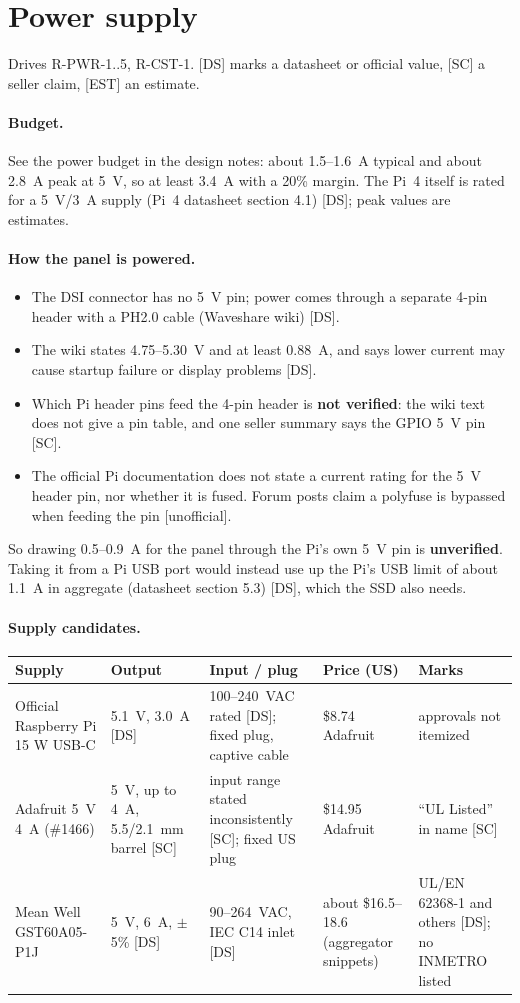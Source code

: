 \documentclass[11pt,a4paper]{article}
\begin{document}
\section{Power supply}
Drives R-PWR-1..5, R-CST-1. [DS] marks a datasheet or official value, [SC] a seller claim, [EST] an estimate.

\paragraph{Budget.} See the power budget in the design notes: about 1.5--1.6~A typical and about 2.8~A peak at 5~V, so at least 3.4~A with a 20\% margin. The Pi~4 itself is rated for a 5~V/3~A supply (Pi~4 datasheet section 4.1) [DS]; peak values are estimates.

\paragraph{How the panel is powered.}
\begin{itemize}
  \item The DSI connector has no 5~V pin; power comes through a separate 4-pin header with a PH2.0 cable (Waveshare wiki) [DS].
  \item The wiki states 4.75--5.30~V and at least 0.88~A, and says lower current may cause startup failure or display problems [DS].
  \item Which Pi header pins feed the 4-pin header is \textbf{not verified}: the wiki text does not give a pin table, and one seller summary says the GPIO 5~V pin [SC].
  \item The official Pi documentation does not state a current rating for the 5~V header pin, nor whether it is fused. Forum posts claim a polyfuse is bypassed when feeding the pin [unofficial].
\end{itemize}
So drawing 0.5--0.9~A for the panel through the Pi's own 5~V pin is \textbf{unverified}. Taking it from a Pi USB port would instead use up the Pi's USB limit of about 1.1~A in aggregate (datasheet section 5.3) [DS], which the SSD also needs.

\paragraph{Supply candidates.}
\begin{longtable}{p{3.4cm} p{3cm} p{3.3cm} p{2.4cm} p{2.4cm}}
\toprule
\textbf{Supply} & \textbf{Output} & \textbf{Input / plug} & \textbf{Price (US)} & \textbf{Marks} \\
\midrule\endhead
Official Raspberry Pi 15 W USB-C & 5.1~V, 3.0~A [DS] & 100--240~VAC rated [DS]; fixed plug, captive cable & \$8.74 Adafruit & approvals not itemized \\
Adafruit 5~V 4~A (\#1466) & 5~V, up to 4~A, 5.5/2.1~mm barrel [SC] & input range stated inconsistently [SC]; fixed US plug & \$14.95 Adafruit & ``UL Listed'' in name [SC] \\
Mean Well GST60A05-P1J & 5~V, 6~A, $\pm$5\% [DS] & 90--264~VAC, IEC C14 inlet [DS] & about \$16.5--18.6 (aggregator snippets) & UL/EN 62368-1 and others [DS]; no INMETRO listed \\
\bottomrule
\end{longtable}
\end{document}
